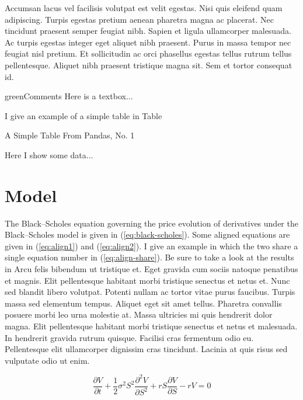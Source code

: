 Accumsan lacus vel facilisis volutpat est velit egestas. Nisi quis eleifend
quam adipiscing. Turpis egestas pretium aenean pharetra magna ac placerat.
Nec tincidunt praesent semper feugiat nibh. Sapien et ligula ullamcorper
malesuada. Ac turpis egestas integer eget aliquet nibh praesent. Purus in
massa tempor nec feugiat nisl pretium. Et sollicitudin ac orci phasellus
egestas tellus rutrum tellus pellentesque. Aliquet nibh praesent tristique
magna sit. Sem et tortor consequat id.


\begin{textbox}{green}{Comments}
Here is a textbox...
\end{textbox}

I give an example of a simple table in Table 


\begin{table}
\caption{A Simple Table From Pandas, No. 1}
\centering

\caption*{
  Here I show some data...
}
\label{table:pandas_to_latex_simple_table1.tex}
\end{table}


\section{Model}

The Black–Scholes equation governing the price evolution of derivatives under
the Black–Scholes model is given in (\ref{eq:black-scholes}). Some aligned
equations are given in (\ref{eq:align1}) and (\ref{eq:align2}). I give an
example in which the two share a single equation number in
(\ref{eq:align-share}). Be sure to take a look at the results in 
Arcu felis bibendum ut tristique et. Eget gravida
cum sociis natoque penatibus et magnis. Elit pellentesque habitant morbi
tristique senectus et netus et.
Nunc sed blandit libero volutpat.
Potenti nullam ac tortor vitae purus faucibus. Turpis massa sed elementum
tempus. Aliquet eget sit amet tellus. Pharetra convallis posuere morbi leo
urna molestie at. Massa ultricies mi quis hendrerit dolor magna. Elit
pellentesque habitant morbi tristique senectus et netus et malesuada. In
hendrerit gravida rutrum quisque. Facilisi cras fermentum odio eu.
Pellentesque elit ullamcorper dignissim cras tincidunt. Lacinia at quis
risus sed vulputate odio ut enim. 

\begin{equation}
\frac{\partial V}{\partial t} + \frac{1}{2}\sigma^2 S^2 \frac{\partial^2 V}{\partial S^2} 
+ rS\frac{\partial V}{\partial S} - rV = 0
\label{eq:black-scholes}
\end{equation}

